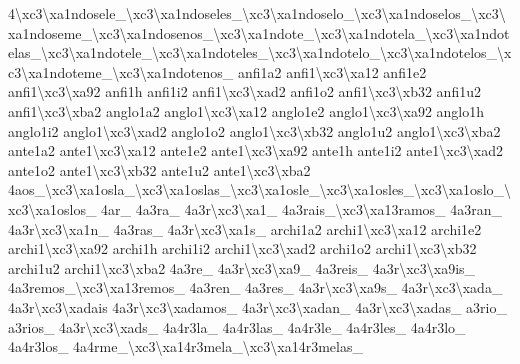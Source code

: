 \begin{DoxyCompactItemize}
4\textbackslash{}xc3\textbackslash{}xa1ndosele\-\_\textbackslash{}xc3\textbackslash{}xa1ndoseles\-\_\textbackslash{}xc3\textbackslash{}xa1ndoselo\-\_\textbackslash{}xc3\textbackslash{}xa1ndoselos\-\_\textbackslash{}xc3\textbackslash{}xa1ndoseme\-\_\textbackslash{}xc3\textbackslash{}xa1ndosenos\-\_\textbackslash{}xc3\textbackslash{}xa1ndote\-\_\textbackslash{}xc3\textbackslash{}xa1ndotela\-\_\textbackslash{}xc3\textbackslash{}xa1ndotelas\-\_\textbackslash{}xc3\textbackslash{}xa1ndotele\-\_\textbackslash{}xc3\textbackslash{}xa1ndoteles\-\_\textbackslash{}xc3\textbackslash{}xa1ndotelo\-\_\textbackslash{}xc3\textbackslash{}xa1ndotelos\-\_\textbackslash{}xc3\textbackslash{}xa1ndoteme\-\_\textbackslash{}xc3\textbackslash{}xa1ndotenos\-\_\- anfi1a2 anfi1\textbackslash{}xc3\textbackslash{}xa12 anfi1e2 anfi1\textbackslash{}xc3\textbackslash{}xa92 anfi1h anfi1i2 anfi1\textbackslash{}xc3\textbackslash{}xad2 anfi1o2 anfi1\textbackslash{}xc3\textbackslash{}xb32 anfi1u2 anfi1\textbackslash{}xc3\textbackslash{}xba2 anglo1a2 anglo1\textbackslash{}xc3\textbackslash{}xa12 anglo1e2 anglo1\textbackslash{}xc3\textbackslash{}xa92 anglo1h anglo1i2 anglo1\textbackslash{}xc3\textbackslash{}xad2 anglo1o2 anglo1\textbackslash{}xc3\textbackslash{}xb32 anglo1u2 anglo1\textbackslash{}xc3\textbackslash{}xba2 ante1a2 ante1\textbackslash{}xc3\textbackslash{}xa12 ante1e2 ante1\textbackslash{}xc3\textbackslash{}xa92 ante1h ante1i2 ante1\textbackslash{}xc3\textbackslash{}xad2 ante1o2 ante1\textbackslash{}xc3\textbackslash{}xb32 ante1u2 ante1\textbackslash{}xc3\textbackslash{}xba2 4aos\-\_\textbackslash{}xc3\textbackslash{}xa1osla\-\_\textbackslash{}xc3\textbackslash{}xa1oslas\-\_\textbackslash{}xc3\textbackslash{}xa1osle\-\_\textbackslash{}xc3\textbackslash{}xa1osles\-\_\textbackslash{}xc3\textbackslash{}xa1oslo\-\_\textbackslash{}xc3\textbackslash{}xa1oslos\-\_\- 4ar\-\_\- 4a3ra\-\_\- 4a3r\textbackslash{}xc3\textbackslash{}xa1\-\_\- 4a3rais\-\_\textbackslash{}xc3\textbackslash{}xa13ramos\-\_\- 4a3ran\-\_\- 4a3r\textbackslash{}xc3\textbackslash{}xa1n\-\_\- 4a3ras\-\_\- 4a3r\textbackslash{}xc3\textbackslash{}xa1s\-\_\- archi1a2 archi1\textbackslash{}xc3\textbackslash{}xa12 archi1e2 archi1\textbackslash{}xc3\textbackslash{}xa92 archi1h archi1i2 archi1\textbackslash{}xc3\textbackslash{}xad2 archi1o2 archi1\textbackslash{}xc3\textbackslash{}xb32 archi1u2 archi1\textbackslash{}xc3\textbackslash{}xba2 4a3re\-\_\- 4a3r\textbackslash{}xc3\textbackslash{}xa9\-\_\- 4a3reis\-\_\- 4a3r\textbackslash{}xc3\textbackslash{}xa9is\-\_\- 4a3remos\-\_\textbackslash{}xc3\textbackslash{}xa13remos\-\_\- 4a3ren\-\_\- 4a3res\-\_\- 4a3r\textbackslash{}xc3\textbackslash{}xa9s\-\_\- 4a3r\textbackslash{}xc3\textbackslash{}xada\-\_\- 4a3r\textbackslash{}xc3\textbackslash{}xadais 4a3r\textbackslash{}xc3\textbackslash{}xadamos\-\_\- 4a3r\textbackslash{}xc3\textbackslash{}xadan\-\_\- 4a3r\textbackslash{}xc3\textbackslash{}xadas\-\_\- a3rio\-\_\- a3rios\-\_\- 4a3r\textbackslash{}xc3\textbackslash{}xads\-\_\- 4a4r3la\-\_\- 4a4r3las\-\_\- 4a4r3le\-\_\- 4a4r3les\-\_\- 4a4r3lo\-\_\- 4a4r3los\-\_\- 4a4rme\-\_\textbackslash{}xc3\textbackslash{}xa14r3mela\-\_\textbackslash{}xc3\textbackslash{}xa14r3melas\-\_\- 
\end{DoxyCompactItemize}
